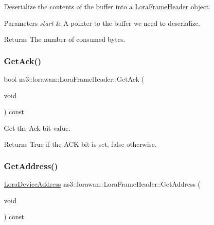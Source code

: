Deserialize the contents of the buffer into a \hyperlink{classns3_1_1lorawan_1_1LoraFrameHeader}{Lora\+Frame\+Header} object.


\begin{DoxyParams}{Parameters}
{\em start} & A pointer to the buffer we need to deserialize. \\
\hline
\end{DoxyParams}
\begin{DoxyReturn}{Returns}
The number of consumed bytes. 
\end{DoxyReturn}
\mbox{\label{classns3_1_1lorawan_1_1LoraFrameHeader_a7f0e234436440b35b450d818c5502c6a}} 
\subsubsection{\texorpdfstring{Get\+Ack()}{GetAck()}}
{\footnotesize\ttfamily bool ns3\+::lorawan\+::\+Lora\+Frame\+Header\+::\+Get\+Ack (\begin{DoxyParamCaption}\item[{void}]{ }\end{DoxyParamCaption}) const}

Get the Ack bit value.

\begin{DoxyReturn}{Returns}
True if the A\+CK bit is set, false otherwise. 
\end{DoxyReturn}
\mbox{\label{classns3_1_1lorawan_1_1LoraFrameHeader_af4f6f7e63f75b330293996a13adef033}} 
\subsubsection{\texorpdfstring{Get\+Address()}{GetAddress()}}
{\footnotesize\ttfamily \hyperlink{classns3_1_1lorawan_1_1LoraDeviceAddress}{Lora\+Device\+Address} ns3\+::lorawan\+::\+Lora\+Frame\+Header\+::\+Get\+Address (\begin{DoxyParamCaption}\item[{void}]{ }\end{DoxyParamCaption}) const}

